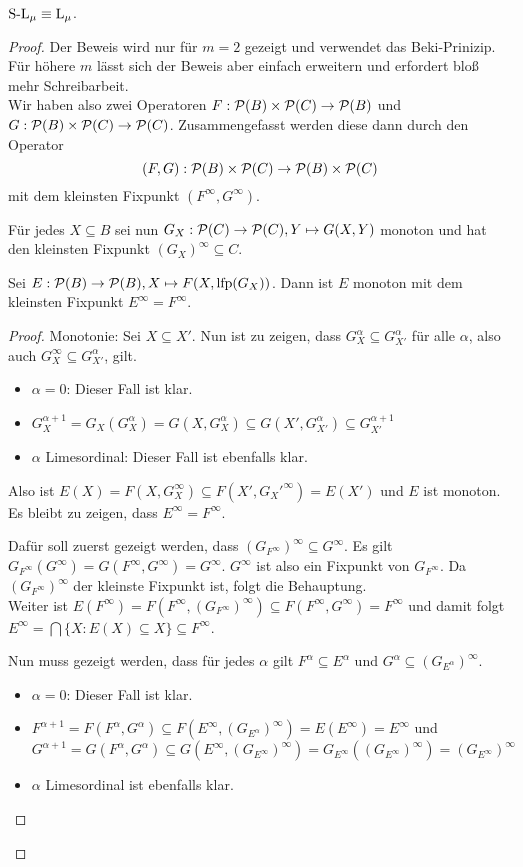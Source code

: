\begin{satz}
	$\operatorname{S-L}_\mu \equiv \operatorname{L}_\mu$.
\end{satz}
\begin{proof}
	Der Beweis wird nur für $m=2$ gezeigt und verwendet das Beki-Prinizip. Für höhere $m$ lässt sich der Beweis aber einfach erweitern und erfordert bloß mehr Schreibarbeit.
	\\
	Wir haben also zwei Operatoren $F:\mathcal{P}(B)\times\mathcal{P}(C)\to \mathcal{P}(B)$ und $G:\mathcal{P}(B)\times \mathcal{P}(C)\to \mathcal{P}(C)$. Zusammengefasst werden diese dann durch den Operator
	\[(F,G):\mathcal{P}(B)\times \mathcal{P}(C)\to \mathcal{P}(B)\times \mathcal{P}(C)\]
	mit dem kleinsten Fixpunkt $(F^\infty,G^\infty)$.
	
	Für jedes $X\subseteq B$ sei nun $G_X:\mathcal{P}(C)\to\mathcal{P}(C), Y\mapsto G(X,Y)$ monoton und hat den kleinsten Fixpunkt $(G_X)^\infty\subseteq C$.
	
	\begin{lemma}
		Sei $E:\mathcal{P}(B)\to\mathcal{P}(B), X\mapsto F(X,\operatorname{lfp}(G_X))$. Dann ist $E$ monoton mit dem kleinsten Fixpunkt $E^\infty = F^\infty$.
	\end{lemma}
	\begin{proof}
		Monotonie: Sei $X\subseteq X'$. Nun ist zu zeigen, dass $G_X^\alpha \subseteq G_{X'}^\alpha$ für alle $\alpha$, also auch $G_X^\infty \subseteq G_{X'}^\alpha$, gilt.
		\begin{itemize}
			\item $\alpha=0$: Dieser Fall ist klar.
			\item $G_X^{\alpha+1}=G_X(G_X^\alpha)=G(X,G_X^\alpha) \subseteq G(X', G_{X'}^\alpha) \subseteq G_{X'}^{\alpha+1}$
			\item $\alpha$ Limesordinal: Dieser Fall ist ebenfalls klar.
		\end{itemize}
		Also ist $E(X)=F(X,G_X^\infty)\subseteq F(X',G_X'^\infty)=E(X')$ und $E$ ist monoton. Es bleibt zu zeigen, dass $E^\infty = F^\infty$.
		
		Dafür soll zuerst gezeigt werden, dass $(G_{F^\infty})^\infty \subseteq G^\infty$. Es gilt $G_{F^\infty}(G^\infty) = G(F^\infty, G^\infty)=G^\infty$. 
		$G^\infty$ ist also ein Fixpunkt von $G_{F^\infty}$. Da $(G_{F^\infty})^\infty$ der kleinste Fixpunkt ist, folgt die Behauptung.
		\\
		Weiter ist $E(F^\infty)=F(F^\infty,(G_{F^\infty})^\infty) \subseteq F(F^\infty, G^\infty)=F^\infty$ und damit folgt $E^\infty = \bigcap\{X : E(X)\subseteq X\} \subseteq F^\infty$.
		
		Nun muss gezeigt werden, dass für jedes $\alpha$ gilt $F^\alpha \subseteq E^\alpha$ und $G^\alpha \subseteq (G_{E^\alpha})^\infty$.
		\begin{itemize}
			\item $\alpha=0$: Dieser Fall ist klar.
			\item $F^{\alpha+1}=F(F^\alpha,G^\alpha)\subseteq F(E^\infty, (G_{E^\alpha})^\infty)=E(E^\infty)=E^\infty$ und $G^{\alpha+1}=G(F^\alpha, G^\alpha)\subseteq G(E^\infty, (G_{E^\infty})^\infty) = G_{E^\infty}((G_{E^\infty})^\infty)=(G_{E^\infty})^\infty$
			\item $\alpha$ Limesordinal ist ebenfalls klar.
		\end{itemize}
	\end{proof}
	

\end{proof}
